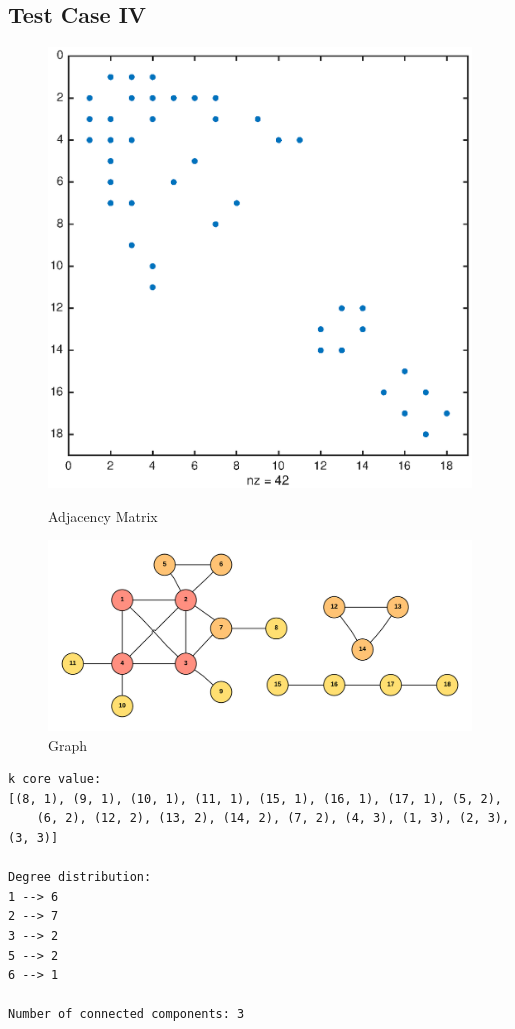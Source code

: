 \subsection{Test Case IV}
\begin{figure}[H]
  \includegraphics[width=\linewidth]{spy4.eps}
  \caption{Adjacency Matrix}
\endminipage\hfill
{}
  \includegraphics[width=\linewidth]{graph4}
  \caption{Graph}
\endminipage
\end{figure}

\begin{verbatim}
k core value:
[(8, 1), (9, 1), (10, 1), (11, 1), (15, 1), (16, 1), (17, 1), (5, 2), 
	(6, 2), (12, 2), (13, 2), (14, 2), (7, 2), (4, 3), (1, 3), (2, 3), (3, 3)]

Degree distribution:
1 --> 6
2 --> 7
3 --> 2
5 --> 2
6 --> 1

Number of connected components: 3
\end{verbatim}

